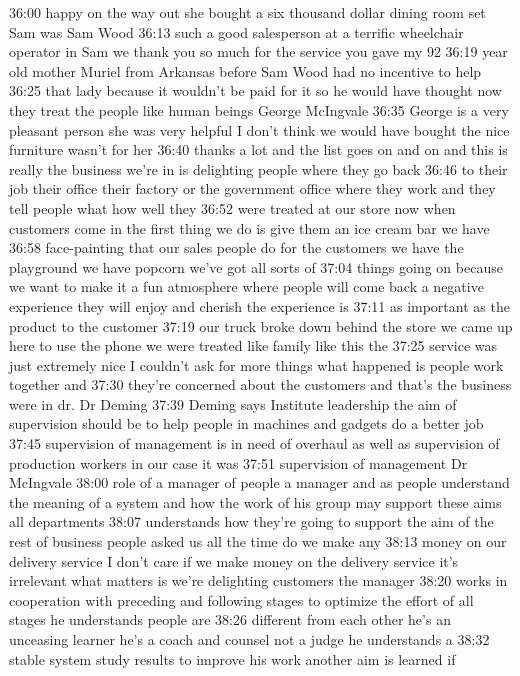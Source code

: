 \documentclass[
]{book}
\begin{document}
36:00
happy on the way out she bought a six thousand dollar dining room set Sam was
Sam Wood
36:13
such a good salesperson at a terrific wheelchair operator in Sam we thank you so much for the service you gave my 92
36:19
year old mother Muriel from Arkansas before Sam Wood had no incentive to help
36:25
that lady because it wouldn't be paid for it so he would have thought now they treat the people like human beings
George McIngvale
36:35
George is a very pleasant person she was very helpful I don't think we would have bought the nice furniture wasn't for her
36:40
thanks a lot and the list goes on and on and this is really the business we're in is delighting people where they go back
36:46
to their job their office their factory or the government office where they work and they tell people what how well they
36:52
were treated at our store now when customers come in the first thing we do is give them an ice cream bar we have
36:58
face-painting that our sales people do for the customers we have the playground we have popcorn we've got all sorts of
37:04
things going on because we want to make it a fun atmosphere where people will come back a negative experience they will enjoy and cherish the experience is
37:11
as important as the product to the customer
37:19
our truck broke down behind the store we came up here to use the phone we were treated like family like this the
37:25
service was just extremely nice I couldn't ask for more things what happened is people work together and
37:30
they're concerned about the customers and that's the business were in dr.
Dr Deming
37:39
Deming says Institute leadership the aim of supervision should be to help people in machines and gadgets do a better job
37:45
supervision of management is in need of overhaul as well as supervision of production workers in our case it was
37:51
supervision of management
Dr McIngvale
38:00
role of a manager of people a manager and as people understand the meaning of a system and how the work of his group may support these aims all departments
38:07
understands how they're going to support the aim of the rest of business people asked us all the time do we make any
38:13
money on our delivery service I don't care if we make money on the delivery service it's irrelevant what matters is we're delighting customers the manager
38:20
works in cooperation with preceding and following stages to optimize the effort of all stages he understands people are
38:26
different from each other he's an unceasing learner he's a coach and counsel not a judge he understands a
38:32
stable system study results to improve his work another aim is learned if
\end{document}
